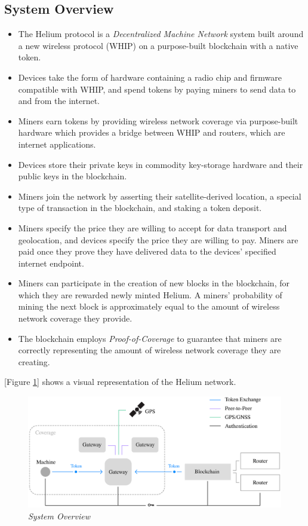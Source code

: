 \documentclass[10pt, nonatbib, nocopyrightspace, reprint]{sigplanconf}
\begin{document}
\subsection{System Overview}

\begin{itemize}
    \item The Helium protocol is a \emph{Decentralized Machine Network} system built around a new wireless protocol (WHIP) on a purpose-built blockchain with a native token.
    \item Devices take the form of hardware containing a radio chip and firmware compatible with WHIP, and spend tokens by paying miners to send data to and from the internet.
    \item Miners earn tokens by providing wireless network coverage via purpose-built hardware which provides a bridge between WHIP and routers, which are internet applications.
    \item Devices store their private keys in commodity key-storage hardware and their public keys in the blockchain.
    \item Miners join the network by asserting their satellite-derived location, a special type of transaction in the blockchain, and staking a token deposit.
    \item Miners specify the price they are willing to accept for data transport and geolocation, and devices specify the price they are willing to pay. Miners are paid once they prove they have delivered data to the devices' specified internet endpoint.
    \item Miners can participate in the creation of new blocks in the blockchain, for which they are rewarded newly minted Helium. A miners' probability of mining the next block is approximately equal to the amount of wireless network coverage they provide.
    \item The blockchain employs \emph{Proof-of-Coverage} to guarantee that miners are correctly representing the amount of wireless network coverage they are creating.
\end{itemize}

[Figure \ref{fig:system}] shows a visual representation of the Helium network.

\begin{figure}[ht]
    \begin{center}
          \includegraphics[width=\textwidth]{schematic.eps}
          \caption{\emph{System Overview}}
          \label{fig:system}
     \end{center}
\end{figure}
\end{document}
